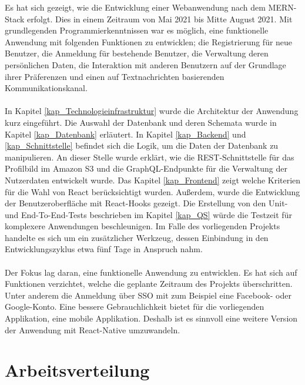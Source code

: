 Es hat sich gezeigt, wie die Entwicklung einer Webanwendung nach dem MERN-Stack erfolgt. Dies in einem Zeitraum von Mai 2021 bis Mitte August 2021. Mit grundlegenden Programmierkenntnissen war es möglich, eine funktionelle Anwendung mit folgenden Funktionen zu entwicklen; die Registrierung für neue Benutzer, die Anmeldung für bestehende Benutzer, die Verwaltung deren persönlichen Daten, die Interaktion mit anderen Benutzern auf der Grundlage ihrer Präferenzen und einen auf Textnachrichten basierenden Kommunikationskanal.
\\\\
In Kapitel \ref{kap_Technologieinfrastruktur} wurde die Architektur der Anwendung kurz eingeführt. %
Die Auswahl der Datenbank und deren Schemata wurde in Kapitel \ref{kap_Datenbank} erläutert. In Kapitel \ref{kap_Backend} und \ref{kap_Schnittstelle} befindet sich die Logik, um die Daten der Datenbank zu manipulieren. An dieser Stelle wurde erklärt, wie die REST-Schnittstelle für das Profilbild im Amazon S3 und die GraphQL-Endpunkte für die Verwaltung der Nutzerdaten entwickelt wurde.  
Das Kapitel \ref{kap_Frontend} zeigt welche Kriterien für die Wahl von React berücksichtigt wurden. Außerdem, wurde die Entwicklung der Benutzeroberfläche mit React-Hooks gezeigt. 
Die Erstellung von den Unit- und End-To-End-Tests beschrieben im Kapitel \ref{kap_QS} würde die Testzeit für komplexere Anwendungen beschleunigen. Im Falle des vorliegenden Projekts handelte es sich um ein zusätzlicher Werkzeug, dessen Einbindung in den Entwicklungszyklus etwa fünf Tage in Anspruch nahm. %
\\\\
Der Fokus lag daran, eine funktionelle Anwendung zu entwicklen. Es hat sich auf Funktionen verzichtet, welche die geplante Zeitraum des Projekts überschritten. Unter anderem die Anmeldung über SSO mit zum Beispiel eine Facebook- oder Google-Konto. %
Eine bessere Gebrauchlichkeit %
bietet für die vorliegenden Applikation, eine mobile Applikation. Deshalb ist es sinnvoll eine weitere Version der Anwendung mit React-Native umzuwandeln.

\section{Arbeitsverteilung}

